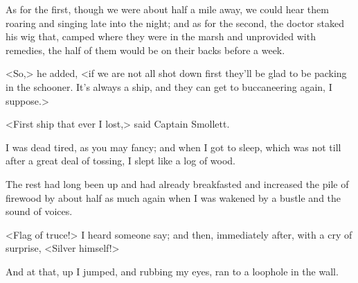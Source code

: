 As for the first, though we were about half a mile away, we could hear them roaring and singing late into the night; and as for the second, the doctor staked his wig that, camped where they were in the marsh and unprovided with remedies, the half of them would be on their backs before a week.

<So,> he added, <if we are not all shot down first they'll be glad to be packing in the schooner. It's always a ship, and they can get to buccaneering again, I suppose.>

<First ship that ever I lost,> said Captain Smollett.

I was dead tired, as you may fancy; and when I got to sleep, which was not till after a great deal of tossing, I slept like a log of wood.

The rest had long been up and had already breakfasted and increased the pile of firewood by about half as much again when I was wakened by a bustle and the sound of voices.

<Flag of truce!> I heard someone say; and then, immediately after, with a cry of surprise, <Silver himself!>

And at that, up I jumped, and rubbing my eyes, ran to a loophole in the wall.